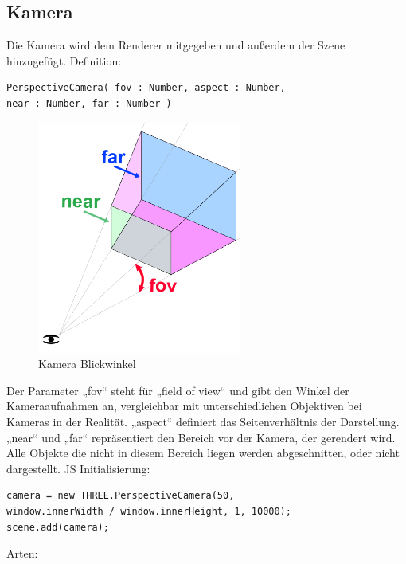 \subsection*{Kamera}
Die Kamera wird dem Renderer mitgegeben und außerdem der Szene hinzugefügt. 
Definition:
\begin{verbatim}
PerspectiveCamera( fov : Number, aspect : Number,
near : Number, far : Number )
\end{verbatim}
\begin{figure}[h]
    \centering
    \includegraphics[width=0.6\textwidth]{images/threejs-camera.png}
    \caption{Kamera Blickwinkel \cite{fundamentals_camera}}
    \label{fig:my_label}
\end{figure}
Der Parameter „fov“ steht für „field of view“ und gibt den Winkel der Kameraaufnahmen an, vergleichbar mit unterschiedlichen Objektiven bei Kameras in der Realität.
„aspect“ definiert das Seitenverhältnis der Darstellung. 
„near“ und „far“ repräsentiert den Bereich vor der Kamera, der gerendert wird. Alle Objekte die nicht in diesem Bereich liegen werden abgeschnitten, oder nicht dargestellt. 
JS Initialisierung:
\begin{verbatim}
camera = new THREE.PerspectiveCamera(50, 
window.innerWidth / window.innerHeight, 1, 10000);
scene.add(camera);
\end{verbatim}
\newpage
Arten: 
